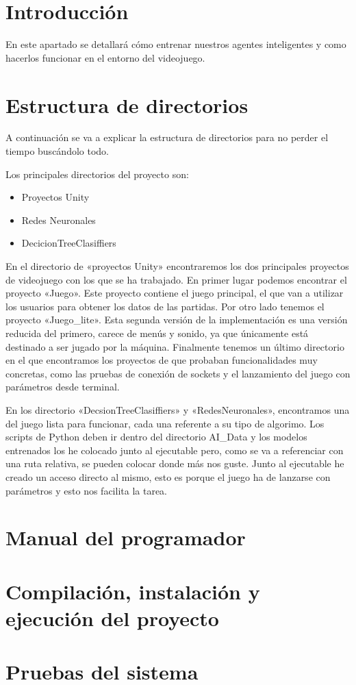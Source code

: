 
\section{Introducción}
En este apartado se detallará cómo entrenar nuestros agentes inteligentes y como hacerlos funcionar en el entorno del videojuego. 

\section{Estructura de directorios}
A continuación se va a explicar la estructura de directorios para no perder el tiempo buscándolo todo.

Los principales directorios del proyecto son:
\begin{itemize}
    \item Proyectos Unity
    \item Redes Neuronales
    \item DecicionTreeClasiffiers
\end{itemize}

En el directorio de «proyectos Unity»  encontraremos los dos principales proyectos de videojuego con los que se ha trabajado. En primer lugar podemos encontrar el proyecto «Juego». Este proyecto contiene el juego principal, el que van a utilizar los usuarios para obtener los datos de las partidas. Por otro lado tenemos el proyecto «Juego\_lite». Esta segunda versión de la implementación es una versión reducida del primero, carece de menús y sonido, ya que únicamente está destinado a ser jugado por la máquina. Finalmente tenemos un último directorio en el que encontramos los proyectos de que probaban funcionalidades muy concretas, como las pruebas de conexión de sockets y el lanzamiento del juego con parámetros desde terminal.

En los directorio «DecsionTreeClasiffiers» y «RedesNeuronales», encontramos una  del juego lista para funcionar, cada una referente a su tipo de algorimo. Los scripts de Python deben ir dentro del directorio AI\_Data y los modelos entrenados los he colocado junto al ejecutable pero, como se va a referenciar con una ruta relativa, se pueden colocar donde más nos guste. Junto al ejecutable he creado un acceso directo al mismo, esto es porque el juego ha de lanzarse con parámetros y esto nos facilita la tarea.

\section{Manual del programador}



\section{Compilación, instalación y ejecución del proyecto}



\section{Pruebas del sistema}
